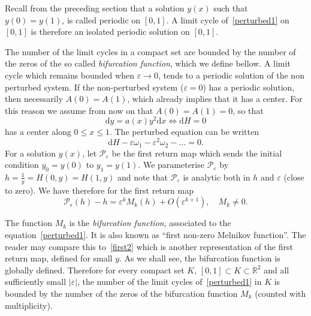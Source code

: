 \documentclass[11pt]{article}
\theoremstyle{definition}
\numberwithin{equation}{section}
\numberwithin{figure}{section}
\numberwithin{table}{section}
\newcommand*{\dd}{\mathrm{d}}
\newcommand*{\dx}{\dd x}
\newcommand*{\dH}{\dd H}
\newcommand*{\dy}{\dd y}
\newcommand*\R{\mathbb{R}}
\begin{document}
Recall from the preceding section that a solution $y(x)$ such that $y(0)=y(1)$, is called periodic on $[0,1]$. A limit cycle of~\eqref{perturbed1} on $[0,1]$ is therefore an isolated periodic solution on $[0,1]$.

The number of the limit cycles in a compact set are bounded by the number of the zeros of the so called \emph{bifurcation function}, which we define bellow. A limit cycle which remains bounded when $\varepsilon \to 0$, tends to a periodic solution of the non perturbed system. If the non-perturbed system ($\varepsilon = 0$) has a periodic solution, then necessarily $A(0)=A(1)$, which already implies that it has a center. For this reason we assume from now on that $A(0)=A(1)=0$, so that
\begin{equation*}
\dy = a(x) y^2 \dx \Longleftrightarrow \dH = 0
\end{equation*}
has a center along $0\leq x \leq 1$. The perturbed equation can be written
\begin{equation}\label{perturbed}
\dH - \varepsilon \omega_1 - \varepsilon^2\omega_2 - \dots = 0.
\end{equation}
For a solution $y(x)$, let $\mathcal P_\varepsilon$ be the first return map which sends the initial condition $y_0=y(0)$ to $y_1=y(1)$. We parameterise $\mathcal P_\varepsilon$ by $h=\frac1y = H(0,y)=H(1,y)$ and note that $\mathcal P_\varepsilon$ is analytic both in $h$ and $\varepsilon$ (close to zero). We have therefore for the first return map
\begin{equation}\label{return1}
\mathcal P_\epsilon (h)- h= \varepsilon^k M_k(h) + O(\varepsilon^{k+1}), \quad M_k \neq 0.
\end{equation}

The function $M_k$ is the\emph{ bifurcation function}, associated to the equation~\eqref{perturbed1}. It is also known as ``first non-zero Melnikov function''. The reader may compare this to~\eqref{first2} which is another representation of the first return map, defined for small $y$. As we shall see, the bifurcation function is globally defined. Therefore for every compact set $K$, $[0,1] \subset K \subset \R^2$ and all sufficiently small $|\varepsilon|$, the number of the limit cycles of~\eqref{perturbed1} in $K$ is bounded by the number of the zeros of the bifurcation function $M_k$ (counted with multiplicity).
\end{document}
